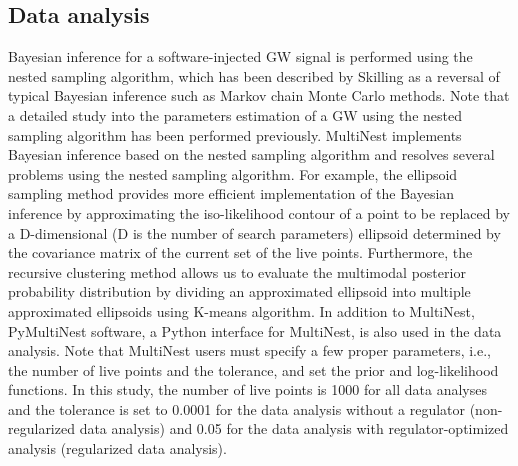 \documentclass[%
 aps,
 prd,
 amsmath,amssymb,
 reprint,%
superscriptaddress
]{revtex4-1}
\begin{document}
\subsection{Data analysis}\label{ken-short_thesis-sec:nest-sampl-algor}
Bayesian inference for a software-injected GW signal is performed using the nested sampling algorithm, which has been described by Skilling\cite{skilling2006nested} as a reversal of typical Bayesian inference such as Markov chain Monte Carlo methods\cite{gelman2013bayesian}. Note that a detailed study into the parameters estimation of a GW using the nested sampling algorithm has been performed previously\cite{PhysRevD.81.062003}. MultiNest implements Bayesian inference based on the nested sampling algorithm\cite{2009MNRAS.398.1601F}\cite{2013arXiv1306.2144F} and resolves several problems using the nested sampling algorithm. For example, the ellipsoid sampling method provides more efficient implementation of the Bayesian inference by approximating the iso-likelihood contour of a point to be replaced by a D-dimensional (D is the number of search parameters) ellipsoid determined by the covariance matrix of the current set of the live points. Furthermore, the recursive clustering method allows us to evaluate the multimodal posterior probability distribution by dividing an approximated ellipsoid into multiple approximated ellipsoids using K-means algorithm\cite{Shaw11072007}\cite{2008MNRAS.384..449F}. In addition to MultiNest, PyMultiNest software\cite{refId0}, a Python interface for MultiNest, is also used in the data analysis. Note that MultiNest users must specify a few proper parameters, i.e., the number of live points and the tolerance, and set the prior and log-likelihood functions. In this study, the number of live points is 1000 for all data analyses and the tolerance is set to 0.0001 for the data analysis without a regulator (non-regularized data analysis) and 0.05 for the data analysis with regulator-optimized analysis (regularized data analysis).
\end{document}

